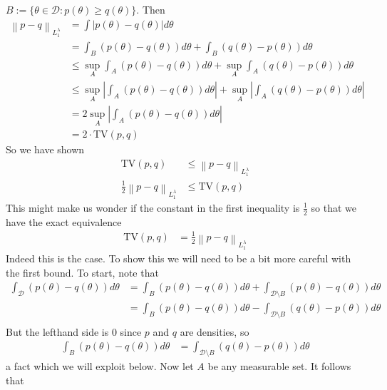 \documentclass[12pt]{article}
\newcommand*{\norm}[1]{\left\lVert#1\right\rVert}
\newcommand*{\abs}[1]{\left\lvert#1\right\rvert}
\begin{document}
$B := \{\theta \in \mathcal{D}:p(\theta) \geq q(\theta)\}$. Then 
\begin{align*}
\norm{p - q}_{L_1^\lambda} &= \int \abs{p(\theta) - q(\theta)} d\theta \\
						      &= \int_B \left(p(\theta) - q(\theta)\right) d\theta +  \int_B \left(q(\theta)  - p(\theta)\right) d\theta \\
						      &\leq \sup_A \int_A \left(p(\theta) - q(\theta)\right) d\theta + \sup_A \int_A \left(q(\theta)  - p(\theta)\right) d\theta \\
						      &\leq \sup_A \abs{\int_A \left(p(\theta) - q(\theta)\right) d\theta} + \sup_A \abs{\int_A \left(q(\theta)  - p(\theta)\right) d\theta} \\
						      &= 2 \sup_A \abs{\int_A \left(p(\theta) - q(\theta)\right) d\theta} \\
						      &= 2 \cdot \text{TV}(p, q)
\end{align*}
So we have shown 
\begin{align*}
\text{TV}(p, q) &\leq \norm{p - q}_{L_1^\lambda} \\
\frac{1}{2} \norm{p - q}_{L_1^\lambda} &\leq \text{TV}(p, q)
\end{align*}
This might make us wonder if the constant in the first inequality is $\frac{1}{2}$ so that we have the exact equivalence 
\begin{align*}
\text{TV}(p, q) &= \frac{1}{2} \norm{p - q}_{L_1^\lambda}
\end{align*}
Indeed this is the case. To show this we will need to be a bit more careful with the first bound. To start, note that 
\begin{align*}
\int_\mathcal{D} \left(p(\theta) - q(\theta)\right) d\theta &= \int_B \left(p(\theta) - q(\theta)\right) d\theta + \int_{\mathcal{D} \setminus B} \left(p(\theta) - q(\theta)\right) d\theta \\
											     &=  \int_B \left(p(\theta) - q(\theta)\right) d\theta - \int_{\mathcal{D} \setminus B} \left(q(\theta) - p(\theta)\right) d\theta \\
\end{align*}
But the lefthand side is $0$ since $p$ and $q$ are densities, so 
\begin{align*}
\int_B \left(p(\theta) - q(\theta)\right) d\theta &= \int_{\mathcal{D} \setminus B} \left(q(\theta) - p(\theta)\right) d\theta
\end{align*}
a fact which we will exploit below. Now let $A$ be any measurable set. It follows that 
\end{document}
